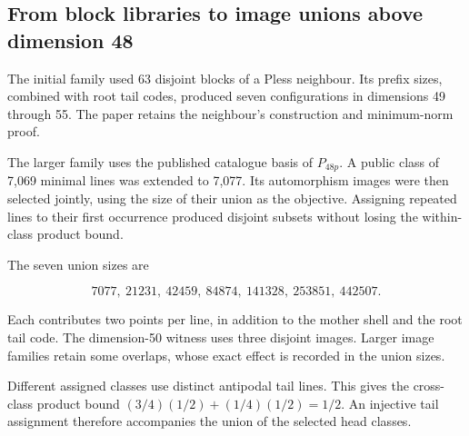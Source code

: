 \subsection{From block libraries to image unions above dimension
48}

The initial family used 63 disjoint blocks of a Pless neighbour. Its
prefix sizes, combined with root tail codes, produced seven
configurations in dimensions 49 through 55. The paper retains the
neighbour's construction and minimum-norm proof.

The larger family uses the published catalogue basis of \(P_{48p}\). A
public class of 7,069 minimal lines was extended to 7,077. Its
automorphism images were then selected jointly, using the size of their
union as the objective. Assigning repeated lines to their first
occurrence produced disjoint subsets without losing the within-class
product bound.

The seven union sizes are

\[
7077,\ 21231,\ 42459,\ 84874,\ 141328,\ 253851,\ 442507.
\]

Each contributes two points per line, in addition to the mother shell
and the root tail code. The dimension-50 witness uses three disjoint
images. Larger image families retain some overlaps, whose exact effect
is recorded in the union sizes.

Different assigned classes use distinct antipodal tail lines. This gives
the cross-class product bound \((3/4)(1/2)+(1/4)(1/2)=1/2\). An
injective tail assignment therefore accompanies the union of the
selected head classes.
